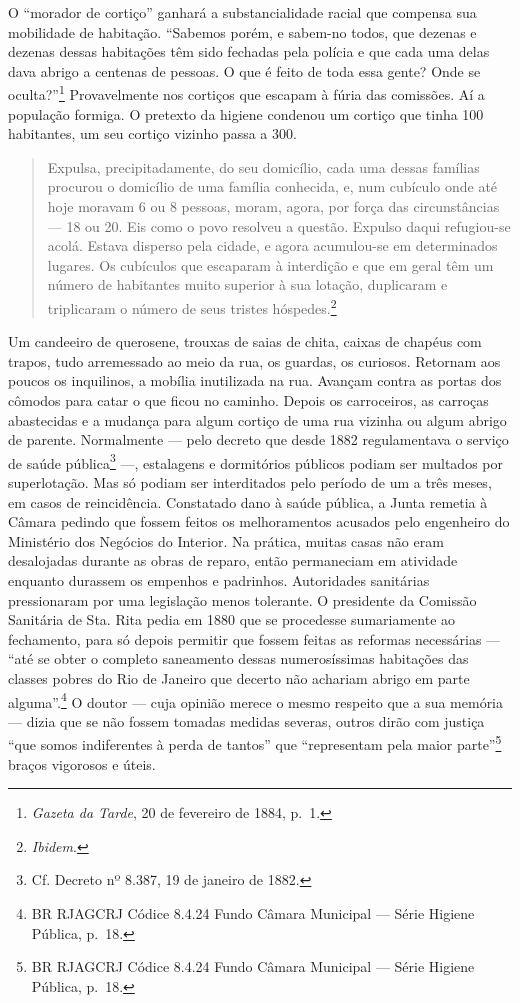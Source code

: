 O ``morador de cortiço'' ganhará a substancialidade racial que compensa
sua mobilidade de habitação. ``Sabemos porém, e sabem-no todos, que
dezenas e dezenas dessas habitações têm sido fechadas pela polícia e que
cada uma delas dava abrigo a centenas de pessoas. O que é feito de toda
essa gente? Onde se oculta?''\footnote{\textit{Gazeta da Tarde}, 20 de
  fevereiro de 1884, p.~1.} Provavelmente nos cortiços que escapam à
fúria das comissões. Aí a população formiga. O pretexto da higiene
condenou um cortiço que tinha 100 habitantes, um seu cortiço vizinho
passa a 300.

\begin{quote}
Expulsa, precipitadamente, do seu domicílio, cada uma dessas famílias
procurou o domicílio de uma família conhecida, e, num cubículo onde até
hoje moravam 6 ou 8 pessoas, moram, agora, por força das circunstâncias
--- 18 ou 20. Eis como o povo resolveu a questão. Expulso daqui
refugiou-se acolá. Estava disperso pela cidade, e agora acumulou-se em
determinados lugares. Os cubículos que escaparam à interdição e que em
geral têm um número de habitantes muito superior à sua lotação,
duplicaram e triplicaram o número de seus tristes hóspedes.\footnote{\textit{Ibidem}.}
\end{quote}

Um candeeiro de querosene, trouxas de saias de chita, caixas de chapéus
com trapos, tudo arremessado ao meio da rua, os guardas, os curiosos.
Retornam aos poucos os inquilinos, a mobília inutilizada na rua. Avançam
contra as portas dos cômodos para catar o que ficou no caminho. Depois
os carroceiros, as carroças abastecidas e a mudança para algum cortiço
de uma rua vizinha ou algum abrigo de parente. Normalmente --- pelo
decreto que desde 1882 regulamentava o serviço de saúde
pública\footnote{Cf. Decreto nº 8.387, 19 de janeiro de 1882.} ---,
estalagens e dormitórios públicos podiam ser multados por superlotação.
Mas só podiam ser interditados pelo período de um a três meses, em casos
de reincidência. Constatado dano à saúde pública, a Junta remetia à
Câmara pedindo que fossem feitos os melhoramentos acusados pelo
engenheiro do Ministério dos Negócios do Interior. Na prática, muitas
casas não eram desalojadas durante as obras de reparo, então permaneciam
em atividade enquanto durassem os empenhos e padrinhos. Autoridades
sanitárias pressionaram por uma legislação menos tolerante. O presidente
da Comissão Sanitária de Sta. Rita pedia em 1880 que se procedesse
sumariamente ao fechamento, para só depois permitir que fossem feitas as
reformas necessárias --- ``até se obter o completo saneamento dessas
numerosíssimas habitações das classes pobres do Rio de Janeiro que
decerto não achariam abrigo em parte alguma''.\footnote{BR RJAGCRJ
  Códice 8.4.24 Fundo Câmara Municipal --- Série Higiene Pública, p.~18.}
O doutor --- cuja opinião merece o mesmo respeito que a sua memória ---
dizia que se não fossem tomadas medidas severas, outros dirão com
justiça ``que somos indiferentes à perda de tantos'' que ``representam
pela maior parte''\footnote{BR RJAGCRJ Códice 8.4.24 Fundo Câmara
  Municipal --- Série Higiene Pública, p.~18.} braços vigorosos e úteis.

